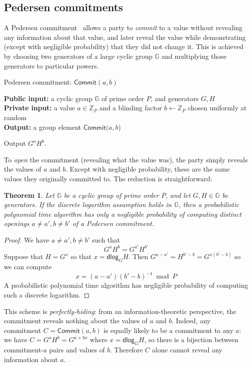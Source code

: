 \documentclass[12pt,a4paper]{article}
\newcommand{\commit}{\mathsf{Commit}}
\newcommand{\dlog}{\mathsf{dlog}}
\newtheorem{theorem}{Theorem}
\theoremstyle{definition}
\begin{document}
\subsection{Pedersen commitments}\label{sec-pedersen}
A Pedersen commitment~\cite{pedersen1991non} allows a party to \textit{commit} to a value without revealing any information about that value, and later reveal the value while demonstrating (except with negligible probability) that they did not change it. This is achieved by choosing two generators of a large cyclic group $\mathbb{G}$ and multiplying those generators to particular powers.

\begin{algorithm}\caption{Pedersen commitment: $\commit(a, b)$}\label{prot:Pedersen}
    \textbf{Public input:} a cyclic group $\mathbb{G}$ of prime order $P$, and generators $G, H$\\
    \textbf{Private input:} a value $a\in\mathbb{Z}_P$ and a blinding factor $b\gets\mathbb{Z}_P$ chosen uniformly at random\\
    \textbf{Output:} a group element $\commit(a, b$)
    \begin{algorithmic}[1]
        \State Output $G^a H^b$.
    \end{algorithmic}
\end{algorithm}
To \textit{open} the commitment (revealing what the value was), the party simply reveals the values of $a$ and $b$. Except with negligible probability, these are the same values they originally committed to. The reduction is straightforward:
\begin{theorem}
    Let $\mathbb{G}$ be a cyclic group of prime order $P$, and let $G, H \in \mathbb{G}$ be generators. If the discrete logarithm assumption holds in $\mathbb{G}$, then a probabilistic polynomial time algorithm has only a negligible probability of computing distinct openings $a\neq a', b\neq b'$ of a Pedersen commitment.
\end{theorem}
\begin{proof}
    We have $a\neq a', b\neq b'$ such that
    $$G^a H^b = G^{a'} H^{b'}$$
    Suppose that $H = G^x$ so that $x = \dlog_G H$. Then $G^{a-a'} = H^{b' - b} = G^{x(b' - b)}$ so we can compute
        $$x = (a - a')(b' - b)^{-1} \bmod P$$
    A probabilistic polynomial time algorithm has negligible probability of computing such a discrete logarithm.
\end{proof}
This scheme is \textit{perfectly-hiding}: from an information-theoretic perspective, the commitment reveals nothing about the values of $a$ and $b$. Indeed, any commitment $C = \commit(a, b)$ is equally likely to be a commitment to any $a$: we have $C = G^aH^b = G^{a + bx}$ where $x = \dlog_G H$, so there is a bijection between commitment-$a$ pairs and values of $b$. Therefore $C$ alone cannot reveal any information about $a$.
\end{document}
